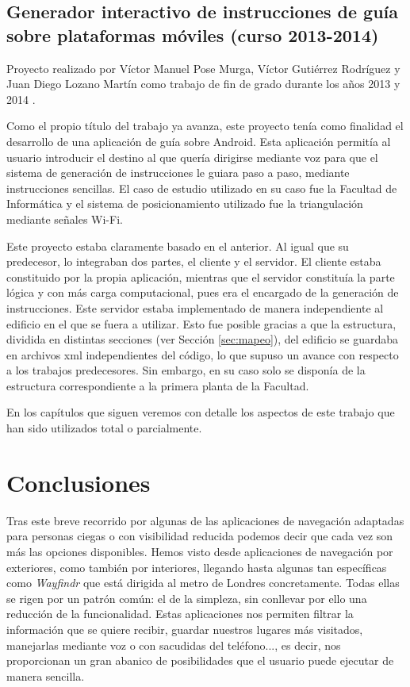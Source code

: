 \subsection{Generador interactivo de instrucciones de guía sobre plataformas móviles (curso 2013-2014)}
\label{sub:genInterTFG}


Proyecto realizado por Víctor Manuel Pose Murga, Víctor Gutiérrez Rodríguez y Juan Diego Lozano Martín como trabajo de fin de grado durante los años 2013 y 2014 \citep{TFGguia}. 

Como el propio título del trabajo ya avanza, este proyecto tenía como finalidad el desarrollo de una aplicación de guía sobre Android. Esta aplicación permitía al usuario introducir el destino al que quería dirigirse mediante voz para que el sistema de generación de instrucciones le guiara paso a paso, mediante instrucciones sencillas. El caso de estudio utilizado en su caso fue la Facultad de Informática y el sistema de posicionamiento utilizado fue la triangulación mediante señales Wi-Fi.

Este proyecto estaba claramente basado en el anterior. Al igual que su predecesor, lo integraban dos partes, el cliente y el servidor. El cliente estaba constituido por la propia aplicación, mientras que el servidor constituía la parte lógica y con más carga computacional, pues era el encargado de la generación de instrucciones. Este servidor estaba implementado de manera independiente al edificio en el que se fuera a utilizar. Esto fue posible gracias a que la estructura, dividida en distintas secciones (ver Sección \ref{sec:mapeo}), del edificio se guardaba en archivos xml independientes del código, lo que supuso un avance con respecto a los trabajos predecesores. Sin embargo, en su caso solo se disponía de la estructura correspondiente a la primera planta de la Facultad.

En los capítulos que siguen veremos con detalle los aspectos de este trabajo que han sido utilizados total o parcialmente.


\section{Conclusiones}
\label{sec:conclusionesposicionamiento}

Tras este breve recorrido por algunas de las aplicaciones de navegación adaptadas para personas ciegas o con visibilidad reducida podemos decir que cada vez son más las opciones disponibles. Hemos visto desde aplicaciones de navegación por exteriores, como también por interiores, llegando hasta algunas tan específicas como \textit{Wayfindr} que está dirigida al metro de Londres concretamente. Todas ellas se rigen por un patrón común: el de la simpleza, sin conllevar por ello una reducción de la funcionalidad. Estas aplicaciones nos permiten filtrar la información que se quiere recibir, guardar nuestros lugares más visitados, manejarlas mediante voz o con sacudidas del teléfono..., es decir, nos proporcionan un gran abanico de posibilidades que el usuario puede ejecutar de manera sencilla.

